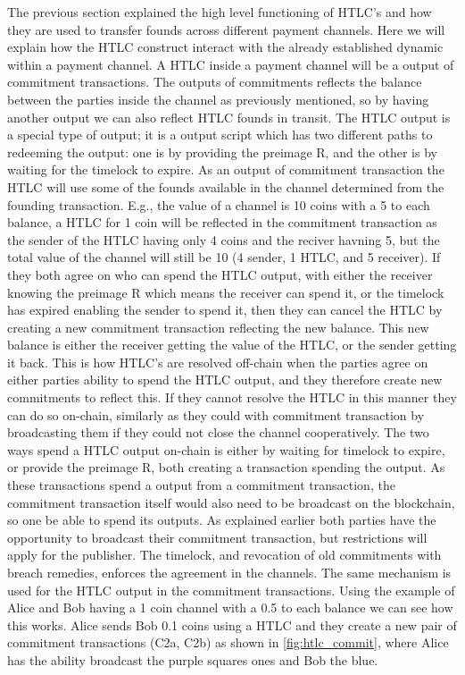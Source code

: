 The previous section explained the high level functioning of HTLC's and how they are used to transfer founds across different payment channels.
Here we will explain how the HTLC construct interact with the already established dynamic within a payment channel.
A HTLC inside a payment channel will be a output of commitment transactions. The outputs of commitments reflects the balance between the parties inside the channel as previously mentioned, so by having another output we can also reflect HTLC founds in transit. The HTLC output is a special type of output; it is a output script which has two different paths to redeeming the output: one is by providing the preimage R, and the other is by waiting for the timelock to expire. 
As an output of commitment transaction the HTLC will use some of the founds available in the channel determined from the founding transaction. E.g., the value of a channel is 10 coins with a 5 to each balance, a HTLC for 1 coin will be reflected in the commitment transaction as the sender of the HTLC having only 4 coins and the reciver havning 5, but the total value of the channel will still be 10 (4 sender, 1 HTLC, and 5 receiver). If they both agree on who can spend the HTLC output, with either the receiver knowing the preimage R which means the receiver can spend it, or the timelock has expired enabling the sender to spend it, then they can cancel the HTLC by creating a new commitment transaction reflecting the new balance. 
This new balance is either the receiver getting the value of the HTLC, or the sender getting it back. This is how HTLC's are resolved off-chain when the parties agree on either parties ability to spend the HTLC output, and they therefore create new commitments to reflect this. If they cannot resolve the HTLC in this manner they can do so on-chain, similarly as they could with commitment transaction by broadcasting them if they could not close the channel cooperatively. 
The two ways spend a HTLC output on-chain is either by waiting for timelock to expire, or provide the preimage R, both creating a transaction spending the output. As these transactions spend a output from a commitment transaction, the commitment transaction itself would also need to be broadcast on the blockchain, so one be able to spend its outputs. As explained earlier both parties have the opportunity to broadcast their commitment transaction, but restrictions will apply for the publisher. The timelock, and revocation of old commitments with breach remedies, enforces the agreement in the channels.
The same mechanism is used for the HTLC output in the commitment transactions. Using the example of Alice and Bob having a 1 coin channel with a 0.5 to each balance we can see how this works. Alice sends Bob 0.1 coins using a HTLC and they create a new pair of commitment transactions (C2a, C2b) as shown in \cref{fig:htlc_commit}, where Alice has the ability broadcast the purple squares ones and Bob the blue.
\\


